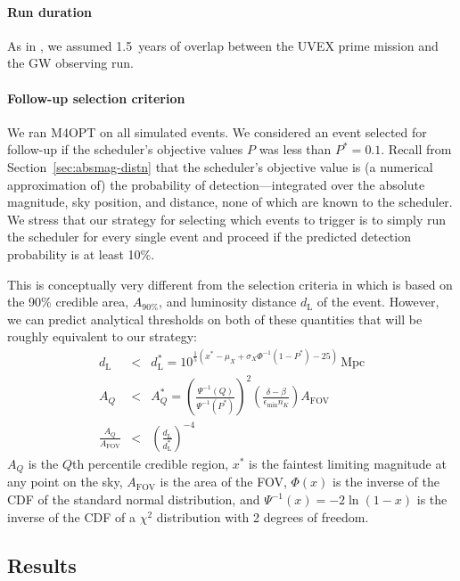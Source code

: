 \documentclass[twocolumn,times]{aastex631}
\begin{document}
\paragraph{Run duration}
As in \citet{2025arXiv250114109C}, we assumed 1.5~years of overlap between the \ac{UVEX} prime mission and the \ac{GW} observing run.

\paragraph{Follow-up selection criterion}
We ran \ac{M4OPT} on all simulated events. We considered an event selected for follow-up if the scheduler's objective values $P$ was less than $P^* = 0.1$. Recall from Section~\ref{sec:absmag-distn} that the scheduler's objective value is (a numerical approximation of) the probability of detection---integrated over the absolute magnitude, sky position, and distance, none of which are known to the scheduler. We stress that our strategy for selecting which events to trigger is to simply run the scheduler for every single event and proceed if the predicted detection probability is at least 10\%.

This is conceptually very different from the selection criteria in \citet{2025arXiv250114109C} which is based on the 90\% credible area, $A_\mathrm{90\%}$, and luminosity distance $d_\mathrm{L}$ of the event. However, we can predict analytical thresholds on both of these quantities that will be roughly equivalent to our strategy:
%
\begin{eqnarray}
    d_\mathrm{L} &<& d_\mathrm{L}^* = 10^{\frac{1}{5}(x^* - \mu_X + \sigma_X \Phi^{-1}(1-P^*) - 25)}\,\mathrm{Mpc} \label{eq:threshold-distance} \\
    A_Q &<& A_Q^* = \left(\frac{\Psi^{-1}(Q)}{\Psi^{-1}(P^*)}\right)^2 \left(\frac{\delta - \beta}{\epsilon_\mathrm{min} n_K}\right)A_\mathrm{FOV} \label{eq:threshold-area} \\
    \frac{A_Q}{A_\mathrm{FOV}} &<& \left(\frac{d_\mathrm{L}}{d_\mathrm{L}^*}\right)^{-4} \label{eq:threshold-area-distance}
\end{eqnarray}
%
$A_Q$ is the $Q$th percentile credible region, $x^*$ is the faintest limiting magnitude at any point on the sky, $A_\mathrm{FOV}$ is the area of the \ac{FOV}, $\Phi(x)$ is the inverse of the \ac{CDF} of the standard normal distribution, and $\Psi^{-1}(x) = -2\ln(1 - x)$ is the inverse of the \ac{CDF} of a $\chi^2$ distribution with 2 degrees of freedom.

\subsection{Results}
\end{document}
